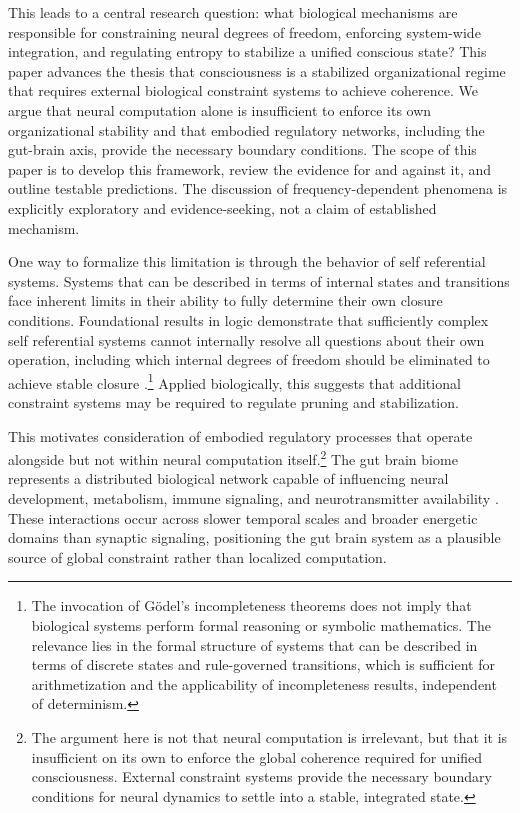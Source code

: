 \documentclass[12pt,letterpaper]{article}
\begin{document}
This leads to a central research question: what biological mechanisms are responsible for constraining neural degrees of freedom, enforcing system-wide integration, and regulating entropy to stabilize a unified conscious state? This paper advances the thesis that consciousness is a stabilized organizational regime that requires external biological constraint systems to achieve coherence. We argue that neural computation alone is insufficient to enforce its own organizational stability and that embodied regulatory networks, including the gut-brain axis, provide the necessary boundary conditions. The scope of this paper is to develop this framework, review the evidence for and against it, and outline testable predictions. The discussion of frequency-dependent phenomena is explicitly exploratory and evidence-seeking, not a claim of established mechanism.

One way to formalize this limitation is through the behavior of self referential systems. Systems that can be described in terms of internal states and transitions face inherent limits in their ability to fully determine their own closure conditions. Foundational results in logic demonstrate that sufficiently complex self referential systems cannot internally resolve all questions about their own operation, including which internal degrees of freedom should be eliminated to achieve stable closure \cite{godel1931, hofstadter1979}.\footnote{The invocation of Gödel’s incompleteness theorems does not imply that biological systems perform formal reasoning or symbolic mathematics. The relevance lies in the formal structure of systems that can be described in terms of discrete states and rule-governed transitions, which is sufficient for arithmetization and the applicability of incompleteness results, independent of determinism.} Applied biologically, this suggests that additional constraint systems may be required to regulate pruning and stabilization.

This motivates consideration of embodied regulatory processes that operate alongside but not within neural computation itself.\footnote{The argument here is not that neural computation is irrelevant, but that it is insufficient on its own to enforce the global coherence required for unified consciousness. External constraint systems provide the necessary boundary conditions for neural dynamics to settle into a stable, integrated state.} The gut brain biome represents a distributed biological network capable of influencing neural development, metabolism, immune signaling, and neurotransmitter availability \cite{cryan2012, foster2013}. These interactions occur across slower temporal scales and broader energetic domains than synaptic signaling, positioning the gut brain system as a plausible source of global constraint rather than localized computation.
\end{document}
